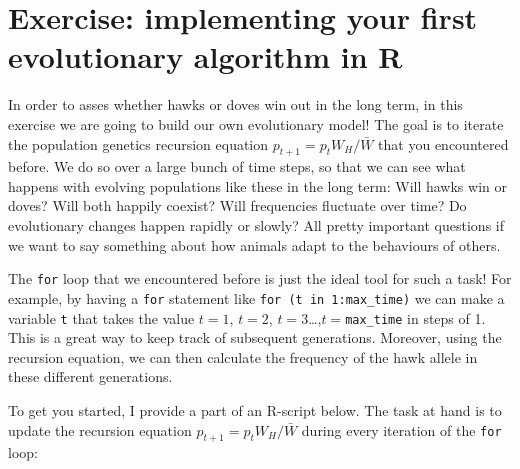 \documentclass[
]{book}
\begin{document}
\hypertarget{exercise-implementing-your-first-evolutionary-algorithm-in-r}{%
\section{Exercise: implementing your first evolutionary algorithm in R}\label{exercise-implementing-your-first-evolutionary-algorithm-in-r}}

In order to asses whether hawks or doves win out in the long term, in this exercise we are going to build our own evolutionary model! The goal is to iterate the population genetics recursion equation \(p_{t+1} = p_{t} W_{H} / \bar{W}\) that you encountered before. We do so over a large bunch of time steps, so that we can see what happens with evolving populations like these in the long term: Will hawks win or doves? Will both happily coexist? Will frequencies fluctuate over time? Do evolutionary changes happen rapidly or slowly? All pretty important questions if we want to say something about how animals adapt to the behaviours of others.

The \texttt{for} loop that we encountered before is just the ideal tool for such a task! For example, by having a \texttt{for} statement like \texttt{for\ (t\ in\ 1:max\_time)} we can make a variable \texttt{t} that takes the value \(t=1\), \(t=2\), \(t=3\)\ldots,\(t=\)\texttt{max\_time} in steps of 1. This is a great way to keep track of subsequent generations. Moreover, using the recursion equation, we can then calculate the frequency of the hawk allele in these different generations.

To get you started, I provide a part of an R-script below. The task at hand is to update the recursion equation \(p_{t+1} = p_{t} W_{H} / \bar{W}\) during every iteration of the \texttt{for} loop:
\end{document}
